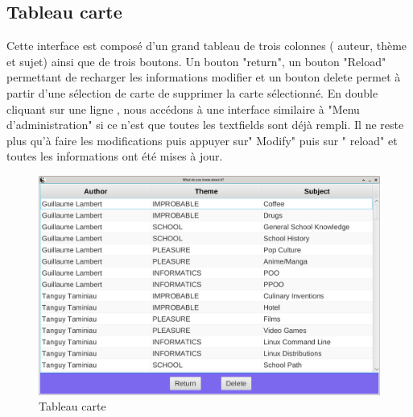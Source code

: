 \newpage
\subsection{Tableau carte}
Cette interface est composé d'un grand tableau de trois colonnes ( auteur, thème et sujet) ainsi que de trois 
boutons. Un bouton "return", un bouton "Reload" permettant de recharger les informations modifier et un bouton 
delete permet à partir d'une sélection de carte de supprimer la carte sélectionné. En double cliquant sur une 
ligne , nous accédons à une interface similaire à "Menu d'administration" si ce n'est que toutes les 
textfields sont déjà rempli. Il ne reste plus qu'à faire les modifications puis appuyer sur" Modify" puis sur "
reload" et toutes les informations ont été mises à jour.

\begin{figure}[h]
	\centering
	\includegraphics[width=\textwidth]{tablecard.png}
	\caption{Tableau carte}
	\label{fig:tablecard}
\end{figure}
